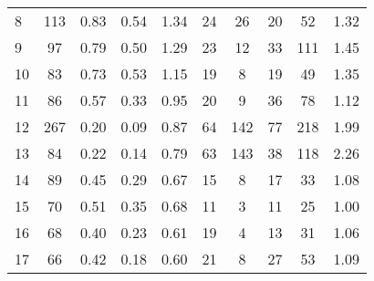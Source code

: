 \begin{tabular}{lccccccccc}
 8 &      113 &                             0.83 &                             0.54 &                             1.34 &              24 &              26 &                                 20 &                              52 &       1.32 \\
 9 &       97 &                             0.79 &                             0.50 &                             1.29 &              23 &              12 &                                 33 &                             111 &       1.45 \\
10 &       83 &                             0.73 &                             0.53 &                             1.15 &              19 &               8 &                                 19 &                              49 &       1.35 \\
11 &       86 &                             0.57 &                             0.33 &                             0.95 &              20 &               9 &                                 36 &                              78 &       1.12 \\
12 &      267 &                             0.20 &                             0.09 &                             0.87 &              64 &             142 &                                 77 &                             218 &       1.99 \\
13 &       84 &                             0.22 &                             0.14 &                             0.79 &              63 &             143 &                                 38 &                             118 &       2.26 \\
14 &       89 &                             0.45 &                             0.29 &                             0.67 &              15 &               8 &                                 17 &                              33 &       1.08 \\
15 &       70 &                             0.51 &                             0.35 &                             0.68 &              11 &               3 &                                 11 &                              25 &       1.00 \\
16 &       68 &                             0.40 &                             0.23 &                             0.61 &              19 &               4 &                                 13 &                              31 &       1.06 \\
17 &       66 &                             0.42 &                             0.18 &                             0.60 &              21 &               8 &                                 27 &                              53 &       1.09 \\

\end{tabular}
